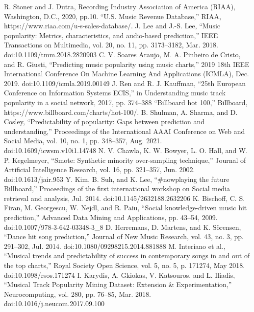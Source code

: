 \documentclass[conference]{IEEEtran}
\begin{document}

\begin{thebibliography}{00}
 R. Stoner and J. Dutra, Recording Industry Association of America (RIAA), Washington, D.C., 2020, pp.10.
 “U.S. Music Revenue Database,” RIAA, https://www.riaa.com/u-s-sales-database/. 
 J. Lee and J.-S. Lee, “Music popularity: Metrics, characteristics, and audio-based prediction,” IEEE Transactions on Multimedia, vol. 20, no. 11, pp. 3173–3182, Mar. 2018. doi:10.1109/tmm.2018.2820903 
 C. V. Soares Araujo, M. A. Pinheiro de Cristo, and R. Giusti, “Predicting music popularity using music charts,” 2019 18th IEEE International Conference On Machine Learning And Applications (ICMLA), Dec. 2019. doi:10.1109/icmla.2019.00149 
 J. Ren and R. J. Kauffman, “25th European Conference on Information Systems ECIS,” in Understanding music track popularity in a social network, 2017, pp. 374–388 
 “Billboard hot 100,” Billboard, https://www.billboard.com/charts/hot-100/. 
 B. Shulman, A. Sharma, and D. Cosley, “Predictability of popularity: Gaps between prediction and understanding,” Proceedings of the International AAAI Conference on Web and Social Media, vol. 10, no. 1, pp. 348–357, Aug. 2021. doi:10.1609/icwsm.v10i1.14748
 N. V. Chawla, K. W. Bowyer, L. O. Hall, and W. P. Kegelmeyer, “Smote: Synthetic minority over-sampling technique,” Journal of Artificial Intelligence Research, vol. 16, pp. 321–357, Jun. 2002. doi:10.1613/jair.953 
 Y. Kim, B. Suh, and K. Lee, “\#nowplaying the future Billboard,” Proceedings of the first international workshop on Social media retrieval and analysis, Jul. 2014. doi:10.1145/2632188.2632206  
 K. Bischoff, C. S. Firan, M. Georgescu, W. Nejdl, and R. Paiu, “Social knowledge-driven music hit prediction,” Advanced Data Mining and Applications, pp. 43–54, 2009. doi:10.1007/978-3-642-03348-3\_8  
 D. Herremans, D. Martens, and K. Sörensen, “Dance hit song prediction,” Journal of New Music Research, vol. 43, no. 3, pp. 291–302, Jul. 2014. doi:10.1080/09298215.2014.881888  
 M. Interiano et al., “Musical trends and predictability of success in contemporary songs in and out of the top charts,” Royal Society Open Science, vol. 5, no. 5, p. 171274, May 2018. doi:10.1098/rsos.171274 
 I. Karydis, A. Gkiokas, V. Katsouros, and L. Iliadis, “Musical Track Popularity Mining Dataset: Extension \& Experimentation,” Neurocomputing, vol. 280, pp. 76–85, Mar. 2018. doi:10.1016/j.neucom.2017.09.100  

\end{thebibliography}
\end{document}
